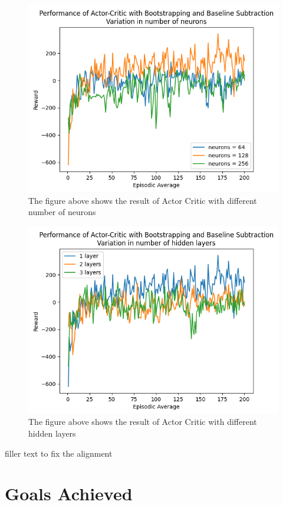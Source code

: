 \documentclass{article}
\begin{document}
\begin{figure}[htbp]
\centering
\includegraphics[width=0.9\linewidth]{Report/images/Performance_of_Actor_Critic_BSandBS_Neurons.png}
\caption{\label{fig:ActorCriticBS2-different neurons}The figure above shows the result of Actor Critic with different number of neurons}
\end{figure}

\begin{figure}[htbp]
\centering
\includegraphics[width=0.9\linewidth]{Report/images/Performance_of_Actor_Critic_BSandBS_Layers.png}
\caption{\label{fig:ActorCriticBS2-different hidden layers}The figure above shows the result of Actor Critic with different hidden layers}
\end{figure}

filler text to fix the alignment

\section{Goals Achieved}
\end{document}
